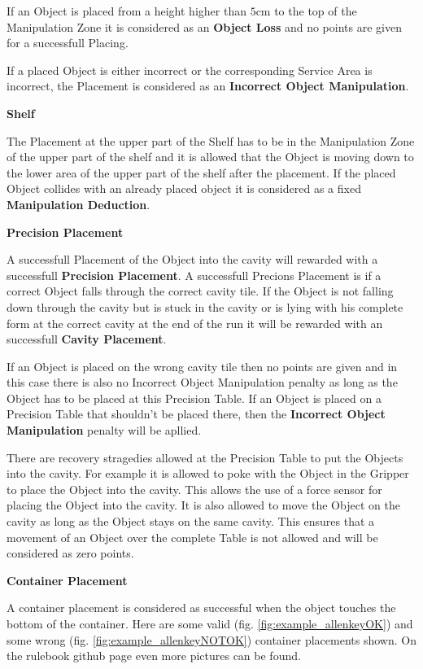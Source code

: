 If an Object is placed from a height higher than $5\si{\centi\meter}$ to the top of the Manipulation Zone it is considered as an \textbf{Object Loss} and no points are given for a successfull Placing.

If a placed Object is either incorrect or the corresponding Service Area is incorrect, the Placement is considered as an \textbf{Incorrect Object Manipulation}. 


\textbf{Shelf}

The Placement at the upper part of the Shelf has to be in the Manipulation Zone of the upper part of the shelf and it is allowed that the Object is moving down to the lower area of the upper part of the shelf after the placement. If the placed Object collides with an already placed object it is considered as a fixed \textbf{Manipulation Deduction}.


\textbf{Precision Placement}

A successfull Placement of the Object into the cavity will rewarded with a successfull \textbf{Precision Placement}. A successfull Precions Placement is if a  correct Object falls through the correct cavity tile. If the Object is not falling down through the cavity but is stuck in the cavity or is lying with his complete form at the correct cavity at the end of the run it will be rewarded with an successfull \textbf{Cavity Placement}.

If an Object is placed on the wrong cavity tile then no points are given and in this case there is also no Incorrect Object Manipulation penalty as long as the Object has to be placed at this Precision Table. If an Object is placed on a Precision Table that shouldn't be placed there, then the \textbf{Incorrect Object Manipulation} penalty will be apllied. 

There are recovery stragedies allowed at the Precision Table to put the Objects into the cavity.
For example it is allowed to poke with the Object in the Gripper to place the Object into the cavity. This  allows the use of a force sensor for placing the Object into the cavity.
It is also allowed to move the Object on the cavity as long as the Object stays on the same cavity. This ensures that a movement of an Object over the complete Table is not allowed and will be considered as zero points.

 

\textbf{Container Placement}

A container placement is considered as successful when the object touches the bottom of the container. Here are some valid (fig. \ref{fig:example_allenkeyOK}) and some wrong (fig. \ref{fig:example_allenkeyNOTOK}) container placements shown. On the rulebook github page even more pictures can be found. 

